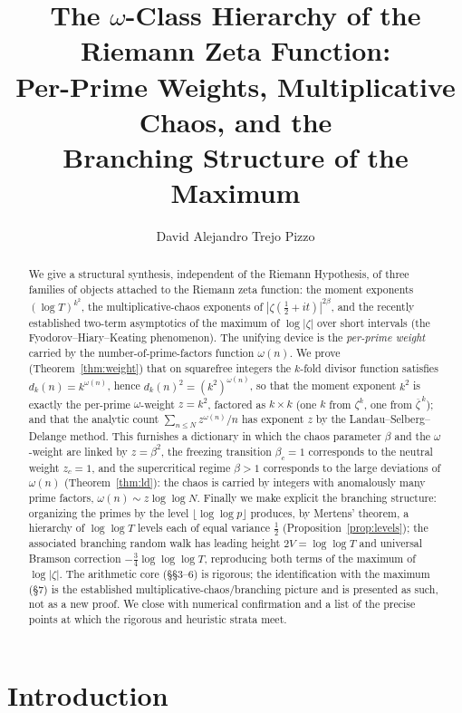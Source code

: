 \documentclass[11pt]{amsart}
\title[The $\omega$-Class Hierarchy of $\zeta$]{The $\omega$-Class Hierarchy of the Riemann Zeta Function:\\[4pt]
Per-Prime Weights, Multiplicative Chaos, and the\\[2pt]
Branching Structure of the Maximum}
\author{David Alejandro Trejo Pizzo}
\theoremstyle{definition}
\newcommand{\half}{\tfrac12}
\newcommand{\dk}{d_k}
\newcommand{\loglog}{\log\log}
\newcommand{\llll}{\log\log\log}
\begin{document}
\begin{abstract}
We give a structural synthesis, independent of the Riemann Hypothesis, of three families of objects attached to
the Riemann zeta function: the moment exponents $(\log T)^{k^2}$, the multiplicative-chaos exponents of
$|\zeta(\half+it)|^{2\beta}$, and the recently established two-term asymptotics of the maximum of $\log|\zeta|$
over short intervals (the Fyodorov--Hiary--Keating phenomenon). The unifying device is the \emph{per-prime
weight} carried by the number-of-prime-factors function $\omega(n)$. We prove (Theorem~\ref{thm:weight}) that on
squarefree integers the $k$-fold divisor function satisfies $\dk(n)=k^{\omega(n)}$, hence $\dk(n)^2=(k^2)^{\omega(n)}$,
so that the moment exponent $k^2$ is exactly the per-prime $\omega$-weight $z=k^2$, factored as $k\times k$ (one
$k$ from $\zeta^k$, one from $\overline{\zeta}^{\,k}$); and that the analytic count $\sum_{n\le N}z^{\omega(n)}/n$
has exponent $z$ by the Landau--Selberg--Delange method. This furnishes a dictionary in which the chaos parameter
$\beta$ and the $\omega$-weight are linked by $z=\beta^2$, the freezing transition $\beta_c=1$ corresponds to the
neutral weight $z_c=1$, and the supercritical regime $\beta>1$ corresponds to the large deviations of $\omega(n)$
(Theorem~\ref{thm:ld}): the chaos is carried by integers with anomalously many prime factors,
$\omega(n)\sim z\loglog N$. Finally we make explicit the branching structure: organizing the primes by the level
$\lfloor\loglog p\rfloor$ produces, by Mertens' theorem, a hierarchy of $\loglog T$ levels each of equal
variance $\tfrac12$ (Proposition~\ref{prop:levels}); the associated branching random walk has leading height
$2V=\loglog T$ and universal Bramson correction $-\tfrac34\llll T$, reproducing both terms of the maximum of
$\log|\zeta|$. The arithmetic core (\S\S3--6) is rigorous; the identification with the maximum (\S7) is the
established multiplicative-chaos/branching picture and is presented as such, not as a new proof. We close with
numerical confirmation and a list of the precise points at which the rigorous and heuristic strata meet.
\end{abstract}

\maketitle



\tableofcontents
\newpage

\section{Introduction}\label{sec:intro}
\end{document}
